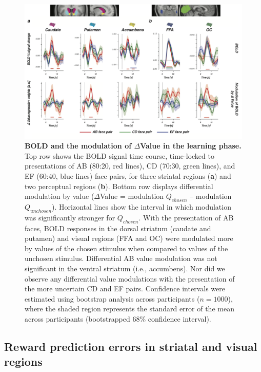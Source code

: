 \documentclass[]{article}
\begin{document}
\begin{figure}
\centering
\includegraphics{_png/Figure3.png}
\caption{\textbf{BOLD and the modulation of \(\Delta\)Value in the
learning phase.} Top row shows the BOLD signal time course, time-locked
to presentations of AB (80:20, red lines), CD (70:30, green lines), and
EF (60:40, blue lines) face pairs, for three striatal regions
(\textbf{a}) and two perceptual regions (\textbf{b}). Bottom row
displays differential modulation by value (\(\Delta\)Value = modulation
\(Q_{chosen}\) -- modulation \(Q_{unchosen}\)). Horizontal lines show
the interval in which modulation was significantly stronger for
\(Q_{chosen}\). With the presentation of AB faces, BOLD responses in the
dorsal striatum (caudate and putamen) and visual regions (FFA and OC)
were modulated more by values of the chosen stimulus when compared to
values of the unchosen stimulus. Differential AB value modulation was
not significant in the ventral striatum (i.e., accumbens). Nor did we
observe any differential value modulations with the presentation of the
more uncertain CD and EF pairs. Confidence intervals were estimated
using bootstrap analysis across participants (\(n=1000\)), where the
shaded region represents the standard error of the mean across
participants (bootstrapped \(68\%\) confidence interval).
\label{Figure 4}}
\end{figure}

\hypertarget{reward-prediction-errors-in-striatal-and-visual-regions}{%
\subsection{Reward prediction errors in striatal and visual
regions}\label{reward-prediction-errors-in-striatal-and-visual-regions}}
\end{document}
